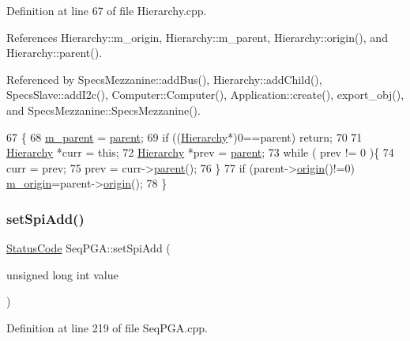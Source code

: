 Definition at line 67 of file Hierarchy.\+cpp.



References Hierarchy\+::m\+\_\+origin, Hierarchy\+::m\+\_\+parent, Hierarchy\+::origin(), and Hierarchy\+::parent().



Referenced by Specs\+Mezzanine\+::add\+Bus(), Hierarchy\+::add\+Child(), Specs\+Slave\+::add\+I2c(), Computer\+::\+Computer(), Application\+::create(), export\+\_\+obj(), and Specs\+Mezzanine\+::\+Specs\+Mezzanine().


\begin{DoxyCode}
67                                               \{
68   \hyperlink{classHierarchy_a5814bb280d4e8539ab25ab6cbfb9cc4f}{m\_parent} = \hyperlink{classHierarchy_a1c7bec8257e717f9c1465e06ebf845fc}{parent};
69   \textcolor{keywordflow}{if} ((\hyperlink{classHierarchy}{Hierarchy}*)0==parent) \textcolor{keywordflow}{return};
70 
71   \hyperlink{classHierarchy}{Hierarchy} *curr = \textcolor{keyword}{this};
72   \hyperlink{classHierarchy}{Hierarchy} *prev = \hyperlink{classHierarchy_a1c7bec8257e717f9c1465e06ebf845fc}{parent};
73   \textcolor{keywordflow}{while} ( prev != 0 )\{
74     curr = prev;
75     prev = curr->\hyperlink{classHierarchy_a1c7bec8257e717f9c1465e06ebf845fc}{parent}();
76   \}
77   \textcolor{keywordflow}{if} (parent->\hyperlink{classHierarchy_aee461dc930ce3871636ff87f075b1b83}{origin}()!=0) \hyperlink{classHierarchy_a16c73e557d3a7c156ffb5dc4102d148e}{m\_origin}=parent->\hyperlink{classHierarchy_aee461dc930ce3871636ff87f075b1b83}{origin}();
78 \}
\end{DoxyCode}
\mbox{\label{classSeqPGA_ac998ce3a6d9b5f2e88cc8393f8c1df53}} 
\subsubsection{\texorpdfstring{set\+Spi\+Add()}{setSpiAdd()}}
{\footnotesize\ttfamily \hyperlink{classStatusCode}{Status\+Code} Seq\+P\+G\+A\+::set\+Spi\+Add (\begin{DoxyParamCaption}\item[{unsigned long int}]{value }\end{DoxyParamCaption})}



Definition at line 219 of file Seq\+P\+G\+A.\+cpp.



